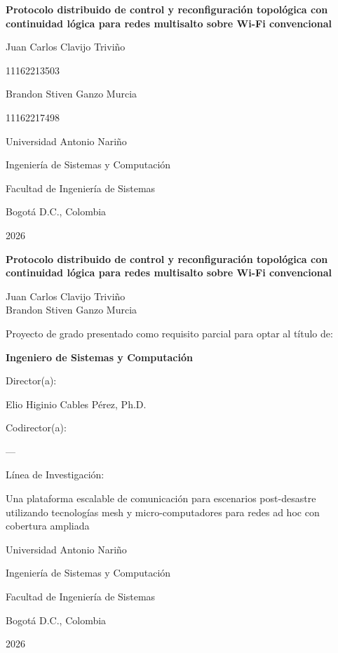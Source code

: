 \documentclass[12pt,letterpaper]{article}
\newcommand{\tituloTrabajo}{Protocolo distribuido de control y reconfiguración topológica con continuidad lógica para redes multisalto sobre Wi-Fi convencional}
\newcommand{\autorUno}{Juan Carlos Clavijo Triviño}
\newcommand{\codigoUno}{11162213503}
\newcommand{\autorDos}{Brandon Stiven Ganzo Murcia}
\newcommand{\codigoDos}{11162217498}
\newcommand{\tituloOptar}{Ingeniero de Sistemas y Computación}
\newcommand{\directorNombre}{Elio Higinio Cables Pérez, Ph.D.}
\newcommand{\lineaInvestigacion}{Una plataforma escalable de comunicación para escenarios post-desastre utilizando tecnologías mesh y micro-computadores para redes ad hoc con cobertura ampliada}
\newcommand{\programa}{Ingeniería de Sistemas y Computación}
\newcommand{\facultad}{Facultad de Ingeniería de Sistemas}
\newcommand{\universidad}{Universidad Antonio Nariño}
\newcommand{\ciudad}{Bogotá D.C., Colombia}
\newcommand{\anio}{2026}
\begin{document}
\pagestyle{empty}

\begin{center}
  \vspace*{1.5cm}
  \noindent\textbf{\tituloTrabajo}\par
  \vspace{2.2cm}
  \autorUno\par
  \codigoUno\par
  \vspace{0.8cm}
  \autorDos\par
  \codigoDos\par
  \vfill
  \universidad\par
  \programa\par
  \facultad\par
  \ciudad\par
  \anio\par
\end{center}
\newpage

\begin{center}
  \vspace*{1.2cm}
  \noindent\textbf{\tituloTrabajo}\par
  \vspace{1.5cm}
  \autorUno\\ \autorDos\par
  \vspace{1cm}
  Proyecto de grado presentado como requisito parcial para optar al título de:\par
  \vspace{0.3cm}
  \noindent\textbf{\tituloOptar}\par
  \vspace{1cm}
  Director(a):\par
  \directorNombre\par
  \vspace{0.5cm}
  Codirector(a):\par
  ---\par
  \vspace{0.8cm}
  Línea de Investigación:\par
  \lineaInvestigacion\par
  \vfill
  \universidad\par
  \programa\par
  \facultad\par
  \ciudad\par
  \anio\par
\end{center}
\newpage
\end{document}
